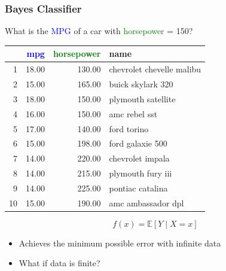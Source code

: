 \documentclass{beamer}
\newcommand{\tc}[2]{\textcolor{#1}{#2}}
\newcommand{\tcb}[1]{\tc{blue}{#1}}
\newcommand{\tcg}[1]{\tc{green}{#1}}
\newcommand{\Ex}{\mathbb{E}}
\begin{document}
\begin{frame} \frametitle{Bayes Classifier}
    \alert{What is the \tcb{MPG} of a car with \tcg{horsepower} = 150?} \\
    \begin{center}
            \begin{tabular}{rrrl}
            \hline
            & \tcb{mpg} & \tcg{horsepower} & name \\
            \hline
            1 & 18.00 & 130.00 & chevrolet chevelle malibu \\
            2 & 15.00 & 165.00 & buick skylark 320 \\
            3 & 18.00 & 150.00 & plymouth satellite \\
            4 & 16.00 & 150.00 & amc rebel sst \\
            5 & 17.00 & 140.00 & ford torino \\
            6 & 15.00 & 198.00 & ford galaxie 500 \\
            7 & 14.00 & 220.00 & chevrolet impala \\
            8 & 14.00 & 215.00 & plymouth fury iii \\
            9 & 14.00 & 225.00 & pontiac catalina \\
            10 & 15.00 & 190.00 & amc ambassador dpl \\
            \hline
            \end{tabular}
    \end{center}
    \pause
    \[f(x) = \Ex [Y \mid X = x] \]
    \pause
    \begin{itemize}
            \item Achieves the minimum possible error with infinite data
            \item \alert{What if data is finite?}
    \end{itemize}
\end{frame}
\end{document}
